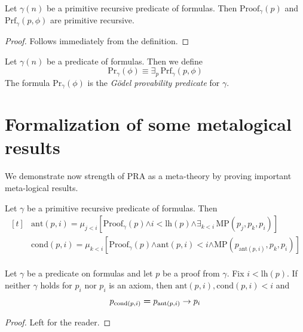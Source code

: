 \documentclass[10pt]{amsart}
\newcommand{\mexists}{\boldsymbol{\exists}}
\newcommand{\mand}{\boldsymbol{\wedge}}
\newcommand{\mle}{\boldsymbol{<}}
\newcommand{\meq}{\boldsymbol{=}}
\begin{document}
\begin{fact}\label{fact:proof_predicates_are_primitive_recursive_if_extralogical_axioms_are_primitive_recursive}
  Let $\gamma(n)$ be a primitive recursive predicate of formulas. Then $\mathrm{Proof}_{\gamma}(p)$ and $\mathrm{Prf}_{\gamma}(p, \phi)$ are primitive recursive.
\end{fact}
\begin{proof}
  Follows immediately from the definition.
\end{proof}

\begin{definition}
  Let $\gamma(n)$ be a predicate of formulas. Then we define
  $$\mathrm{Pr}_{\gamma}(\phi) \equiv \mexists_p\,\mathrm{Prf}_{\gamma}(p,\phi)$$
  The formula $\mathrm{Pr}_{\gamma}(\phi)$ is the \textit{G{\"o}del provability predicate} for $\gamma$.
\end{definition}

\section{Formalization of some metalogical results}
\noindent
We demonstrate now strength of $\mathrm{PRA}$ as a meta-theory by proving important meta-logical results.

\begin{definition}
  Let $\gamma$ be a primitive recursive predicate of formulas. Then
  $$
  \begin{aligned}[t]
  &\mathrm{ant}(p,i) = \mu_{j < i}\left[\mathrm{Proof}_{\gamma}(p) \mand i \mle \mathrm{lh}(p) \mand \mexists_{k < i}\,\mathrm{MP}\left(p_j,p_k,p_i\right)\right]\\
  &\mathrm{cond}(p,i) = \mu_{k < i}\left[\mathrm{Proof}_{\gamma}(p) \mand \mathrm{ant}(p,i) < i \mand \mathrm{MP}\left(p_{\mathrm{ant}(p,i)},p_k,p_i\right)\right]\\
  \end{aligned}
  $$
\end{definition}

\begin{fact}\label{fact:structure_of_modus_ponens}
  Let $\gamma$ be a predicate on formulas and let $p$ be a proof from $\gamma$. Fix $i \mle \mathrm{lh}(p)$. If neither $\gamma$ holds for $p_i$ nor $p_i$ is an axiom, then $\mathrm{ant}(p,i), \mathrm{cond}(p,i) \mle i$ and
  $$p_{\mathrm{cond}(p,i)} \meq p_{\mathrm{ant}(p,i)} \ra p_i$$ 
\end{fact}
\begin{proof}
  Left for the reader.
\end{proof}
\end{document}
